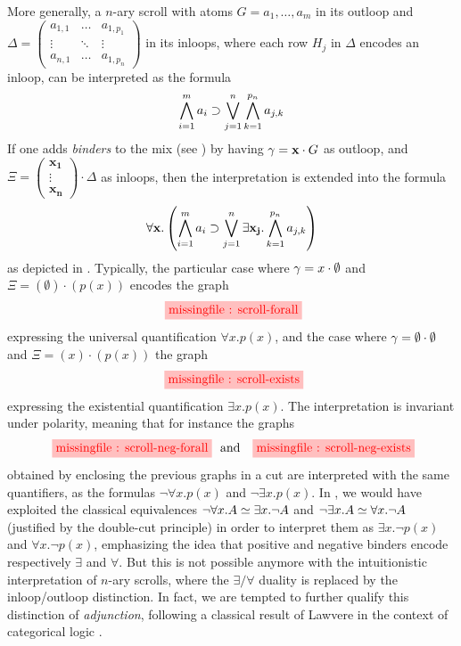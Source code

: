 More generally, a $n$-ary scroll with atoms $G = a_1, \ldots, a_m$ in its outloop and
$\Delta = \begin{pmatrix}
  a_{1,1} & \ldots & a_{1,p_1} \\
  \vdots & \ddots & \vdots \\
  a_{n,1} & \ldots & a_{1,p_n}
\end{pmatrix}$
in its inloops, where each row $H_j$ in $\Delta$ encodes an inloop, can be
interpreted as the formula
$$\bigwedge_{i = 1}^{m}{a_i} \supset \bigvee_{j = 1}^{n}\bigwedge_{k = 1}^{p_n}{a_{j,k}}$$
If one adds \emph{binders} to the mix (see ) by having $\gamma =
\mathbf{x} \cdot G$ as outloop, and
$\Xi = \begin{pmatrix}
  \mathbf{x_1} \\
  \vdots \\
  \mathbf{x_n}
\end{pmatrix} \cdot \Delta$ as inloops, then the interpretation is extended into
the formula
$$\forall \mathbf{x}. \left(\bigwedge_{i = 1}^{m}{a_i} \supset \bigvee_{j = 1}^{n}\exists \mathbf{x_j}. \bigwedge_{k = 1}^{p_n}{a_{j,k}}\right)$$
as depicted in . Typically, the particular case where $\gamma
= x \cdot \emptyset$ and $\Xi = (\emptyset) \cdot (p(x))$ encodes the graph
$$\stkfig{1}{scroll-forall}$$
expressing the universal quantification $\forall x. p(x)$, and the case where
$\gamma = \emptyset \cdot \emptyset$ and $\Xi = (x) \cdot (p(x))$ the graph
$$\stkfig{1}{scroll-exists}$$
expressing the existential quantification $\exists x. p(x)$. The interpretation
is invariant under polarity, meaning that for instance the graphs
$$\stkfig{1}{scroll-neg-forall} \text{   and   } \stkfig{1}{scroll-neg-exists}$$
obtained by enclosing the previous graphs in a cut are interpreted with the same
quantifiers, as the formulas $\neg \forall x. p(x)$ and $\neg \exists x. p(x)$.
In , we would have exploited the classical equivalences $\neg \forall
x. A \simeq \exists x. \neg A$ and $\neg \exists x. A \simeq \forall x.
\neg A$ (justified by the double-cut principle) in order to interpret them as
$\exists x. \neg p(x)$ and $\forall x. \neg p(x)$, emphasizing the idea that
positive and negative binders encode respectively $\exists$ and $\forall$. But
this is not possible anymore with the intuitionistic interpretation of $n$-ary
scrolls, where the $\exists/\forall$ duality is replaced by the inloop/outloop
distinction. In fact, we are tempted to further qualify this distinction of
\emph{adjunction}, following a classical result of Lawvere in the context of
categorical logic .

